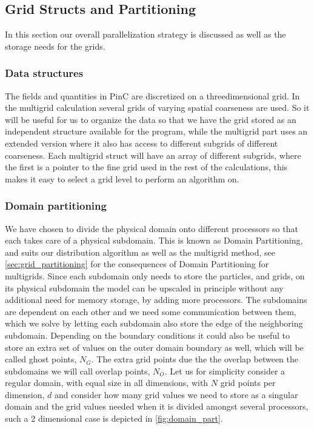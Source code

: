 	\subsection{Grid Structs and Partitioning}
		In this section our overall parallelization strategy is discussed as well
		as the storage needs for the grids.

	\subsubsection{Data structures}
	The fields and quantities in PinC are discretized on a threedimensional
	grid. In the multigrid calculation
	several grids of varying spatial coarseness are used. So it will
	be useful for us to organize the data so that we have the grid stored as an
	independent structure available for the program, while the multigrid part uses
	an extended version where it also has access to different subgrids of different
	coarseness. Each multigrid struct will have an array of different subgrids,
	where the first is a pointer to the fine grid used in the rest of the calculations,
	this makes it easy to select a grid level to perform an algorithm on.

	\subsubsection{Domain partitioning}
		We have chosen to divide the physical domain onto different processors so that each takes
		care of a physical subdomain. This is known as Domain Partitioning, and suits
		our distribution algorithm as well as the multigrid method, see \cref{sec:grid_partitioning}
		for the consequences of Domain Partitioning for multigrids. Since each
		subdomain only needs to store the particles, and grids, on its physical subdomain
		the model can be upscaled in principle without any additional need for memory storage,
		by adding more processors.
		The subdomains are dependent on each other and we need
		some communication between them, which we solve by letting each subdomain
		also store the edge of the neighboring subdomain. Depending on the boundary
		conditions it could also be useful to store an extra set of values on the
		outer domain boundary as well, which will be called ghost points, \(N_G\).
		The extra grid points due the the overlap between the subdomains we will call
		overlap points, \(N_O\). Let us for simplicity consider a regular domain,
		with equal size in all dimensions, with \(N\) grid points per dimension,
		\(d\) and consider how many grid values we need to store as a singular domain
		and the grid values needed when it is divided amongst several processors, such
		a 2 dimensional case is depicted in \cref{fig:domain_part}.

